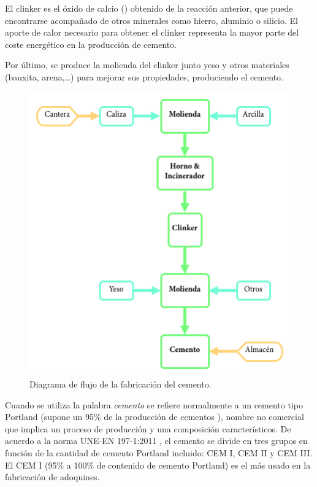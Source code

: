 \begin{center}
\end{center}

El clinker es el óxido de calcio () obtenido de la reacción anterior, que puede encontrarse acompañado de otros minerales como hierro, aluminio o silicio. El aporte de calor necesario para obtener el clinker representa la mayor parte del coste energético en la producción de cemento.

Por último, se produce la molienda del clinker junto yeso y otros materiales (bauxita, arena,\ldots) para mejorar sus propiedades, produciendo el cemento.

\begin{figure}[!htb]
\centering
\includegraphics[width=15cm]{cemento.png}
\caption{Diagrama de flujo de la fabricación del cemento.}
\label{fig:cemento}
\end{figure}

Cuando se utiliza la palabra \emph{cemento} se refiere normalmente a un cemento tipo Portland (supone un 95\% de la producción de cementos \cite{jsjunnesson}), nombre no comercial que implica un proceso de producción y una composición característicos. De acuerdo a la norma UNE-EN 197-1:2011 \cite{une1971}, el cemento se divide en tres grupos en función de la cantidad de cemento Portland incluido: CEM I, CEM II y CEM III. El CEM I (95\% a 100\% de contenido de cemento Portland) es el más usado en la fabricación de adoquines.

